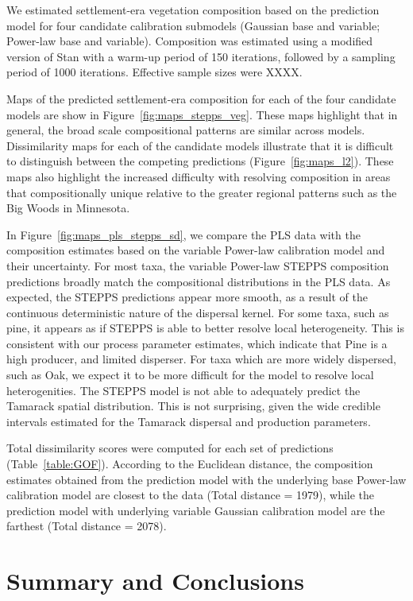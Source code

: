 \documentclass[12pt]{article}
\begin{document}
We estimated settlement-era vegetation composition based on the
prediction model for four candidate calibration submodels (Gaussian
base and variable; Power-law base and variable). Composition was
estimated using a modified version of Stan with a warm-up period of
150 iterations, followed by a sampling period of 1000
iterations. Effective sample sizes were XXXX.

Maps of the predicted settlement-era composition for each of the four
candidate models are show in Figure~\ref{fig:maps_stepps_veg}. These
maps highlight that in general, the broad scale compositional patterns
are similar across models. Dissimilarity maps for each of the
candidate models illustrate that it is difficult to distinguish
between the competing predictions (Figure~\ref{fig:maps_l2}). These
maps also highlight the increased difficulty with resolving
composition in areas that compositionally unique relative to the
greater regional patterns such as the Big Woods in Minnesota.

In Figure~\ref{fig:maps_pls_stepps_sd}, we compare the PLS data with
the composition estimates based on the variable Power-law calibration
model and their uncertainty. For most taxa, the variable Power-law
STEPPS composition predictions broadly match the compositional
distributions in the PLS data. As expected, the STEPPS predictions
appear more smooth, as a result of the continuous deterministic nature
of the dispersal kernel. For some taxa, such as pine, it appears as if
STEPPS is able to better resolve local heterogeneity. This is
consistent with our process parameter estimates, which indicate that
Pine is a high producer, and limited disperser. For taxa which are
more widely dispersed, such as Oak, we expect it to be more difficult
for the model to resolve local heterogenities. The STEPPS model is not
able to adequately predict the Tamarack spatial distribution. This is
not surprising, given the wide credible intervals estimated for the
Tamarack dispersal and production parameters.

Total dissimilarity scores were computed for each set of predictions
(Table~\ref{table:GOF}). According to the Euclidean distance, the
composition estimates obtained from the prediction model with the
underlying base Power-law calibration model are closest to the data
(Total distance = 1979), while the prediction model with underlying
variable Gaussian calibration model are the farthest (Total distance =
2078).

\section{Summary and Conclusions}
\end{document}
